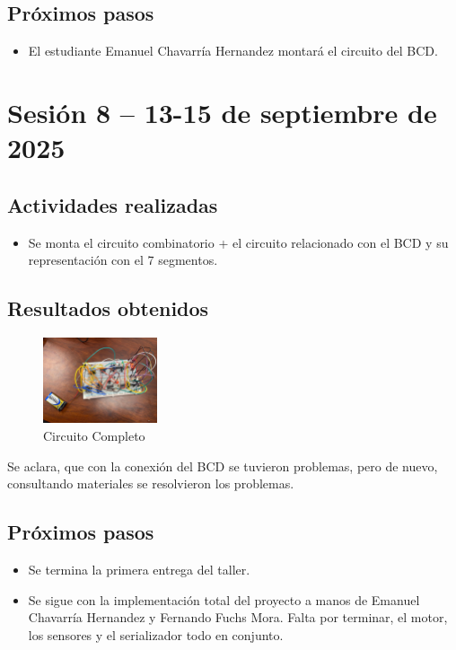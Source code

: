 \documentclass[12pt,letterpaper]{article}
\begin{document}
\subsection*{Próximos pasos}
\begin{itemize}
    \item El estudiante Emanuel Chavarría Hernandez montará el circuito del BCD.
\end{itemize}


\section{Sesión 8 -- 13-15 de septiembre de 2025}
\subsection*{Actividades realizadas}
\begin{itemize}
    \item Se monta el circuito combinatorio  + el circuito relacionado con el BCD y su representación con el 7 segmentos.
\end{itemize}

\subsection*{Resultados obtenidos}
\begin{figure}[H]
    \centering
    \includegraphics[width=0.3\textwidth]{images/todo_real.jpg} %
    \caption{Circuito Completo}
    \label{fig:todo_taller}
\end{figure}
Se aclara, que con la conexión del BCD se tuvieron problemas, pero de nuevo, consultando materiales se resolvieron los problemas.

\subsection*{Próximos pasos}
\begin{itemize}
    \item Se termina la primera entrega del taller.
    \item Se sigue con la implementación total del proyecto a manos de Emanuel Chavarría Hernandez y Fernando Fuchs Mora. Falta por terminar, el motor, los sensores y el serializador todo en conjunto.
\end{itemize}
\end{document}
